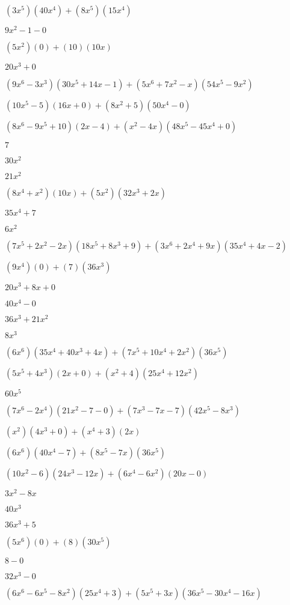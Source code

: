 \documentclass{article}
\begin{document}
\begin{multicols}{2}
$(3x^{5})(40x^{4})+(8x^{5})(15x^{4})$\item $9x^{2}-1-0$\item $(5x^2)(0)+(10)(10x)$\item $20x^{3}+0$\item $(9x^{6}-3x^{3})(30x^{5}+14x-1)+(5x^{6}+7x^2-x)(54x^{5}-9x^{2})$\item $(10x^{5}-5)(16x+0)+(8x^2+5)(50x^{4}-0)$\item $(8x^{6}-9x^{5}+10)(2x-4)+(x^2-4x)(48x^{5}-45x^{4}+0)$\item $7$\item $30x^{2}$\item $21x^{2}$\item $(8x^{4}+x^2)(10x)+(5x^2)(32x^{3}+2x)$\item $35x^{4}+7$\item $6x^{2}$\item $(7x^{5}+2x^2-2x)(18x^{5}+8x^{3}+9)+(3x^{6}+2x^{4}+9x)(35x^{4}+4x-2)$\item $(9x^{4})(0)+(7)(36x^{3})$\item $20x^{3}+8x+0$\item $40x^{4}-0$\item $36x^{3}+21x^{2}$\item $8x^{3}$\item $(6x^{6})(35x^{4}+40x^{3}+4x)+(7x^{5}+10x^{4}+2x^2)(36x^{5})$\item $(5x^{5}+4x^{3})(2x+0)+(x^2+4)(25x^{4}+12x^{2})$\item $60x^{5}$\item $(7x^{6}-2x^{4})(21x^{2}-7-0)+(7x^{3}-7x-7)(42x^{5}-8x^{3})$\item $(x^2)(4x^{3}+0)+(x^{4}+3)(2x)$\item $(6x^{6})(40x^{4}-7)+(8x^{5}-7x)(36x^{5})$\item $(10x^2-6)(24x^{3}-12x)+(6x^{4}-6x^2)(20x-0)$\item $3x^{2}-8x$\item $40x^{3}$\item $36x^{3}+5$\item $(5x^{6})(0)+(8)(30x^{5})$\item $8-0$\item $32x^{3}-0$\item $(6x^{6}-6x^{5}-8x^2)(25x^{4}+3)+(5x^{5}+3x)(36x^{5}-30x^{4}-16x)$\item 
\end{multicols}
\end{document}

